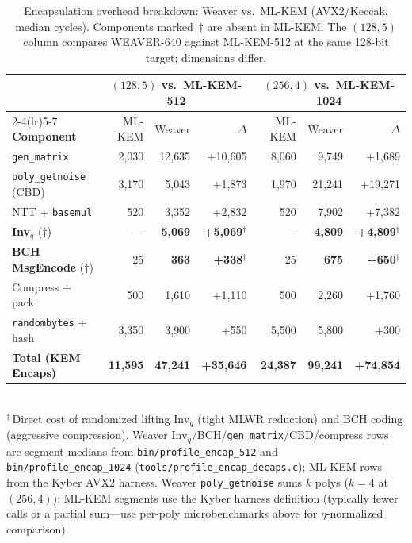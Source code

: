 \begin{table}[h]
\centering
\caption{Encapsulation overhead breakdown: Weaver vs.\ ML-KEM (AVX2/Keccak,
         median cycles). Components marked~$\dagger$ are absent in ML-KEM.
         The $(128,5)$ column compares \textsc{WEAVER-640} against ML-KEM-512
         at the same 128-bit target; dimensions differ.}
\label{tab:overhead_breakdown}
\renewcommand{\arraystretch}{1.12}
\small
\begin{tabular}{lrrrrrr}
\toprule
 & \multicolumn{3}{c}{\textbf{$(128,5)$ vs.\ ML-KEM-512}} &
   \multicolumn{3}{c}{\textbf{$(256,4)$ vs.\ ML-KEM-1024}} \\
\cmidrule(lr){2-4}\cmidrule(lr){5-7}
\textbf{Component} & ML-KEM & Weaver & $\Delta$ & ML-KEM & Weaver & $\Delta$ \\
\midrule
\texttt{gen\_matrix}              & 2{,}030 & 12{,}635 & +10{,}605
                                  & 8{,}060 & 9{,}749  & +1{,}689 \\
\texttt{poly\_getnoise} (CBD)     & 3{,}170 & 5{,}043  & +1{,}873
                                  & 1{,}970 & 21{,}241 & +19{,}271 \\
NTT + \texttt{basemul}            & 520     & 3{,}352  & +2{,}832
                                  & 520     & 7{,}902  & +7{,}382 \\
\textbf{Inv}$_q$ ($\dagger$)      & ---     & \textbf{5{,}069}  & \textbf{+5{,}069}$^\dagger$
                                  & ---      & \textbf{4{,}809} & \textbf{+4{,}809}$^\dagger$ \\
\textbf{BCH MsgEncode} ($\dagger$)& 25      & \textbf{363}  & \textbf{+338}$^\dagger$
                                  & 25       & \textbf{675}  & \textbf{+650}$^\dagger$ \\
Compress + pack                   & 500     & 1{,}610  & +1{,}110
                                  & 500      & 2{,}260  & +1{,}760 \\
\texttt{randombytes} + hash       & 3{,}350 & 3{,}900  & +550
                                  & 5{,}500  & 5{,}800  & +300 \\
\midrule
\textbf{Total (KEM Encaps)}       & \textbf{11{,}595} & \textbf{47{,}241} & \textbf{+35{,}646}
                                  & \textbf{24{,}387} & \textbf{99{,}241} & \textbf{+74{,}854} \\
\bottomrule
\end{tabular}
\smallskip\\
{\footnotesize $^\dagger$\,Direct cost of randomized lifting $\mathrm{Inv}_q$
(tight MLWR reduction) and BCH coding (aggressive compression).
Weaver $\mathrm{Inv}_q$/BCH/\texttt{gen\_matrix}/CBD/compress rows are segment
medians from \texttt{bin/profile\_encap\_512} and
\texttt{bin/profile\_encap\_1024} (\texttt{tools/profile\_encap\_decaps.c});
ML-KEM rows from the Kyber AVX2 harness.
Weaver \texttt{poly\_getnoise} sums $k$ polys ($k{=}4$ at $(256,4)$); ML-KEM
segments use the Kyber harness definition (typically fewer calls or a partial
sum---use per-poly microbenchmarks above for $\eta$-normalized comparison).}
\end{table}

